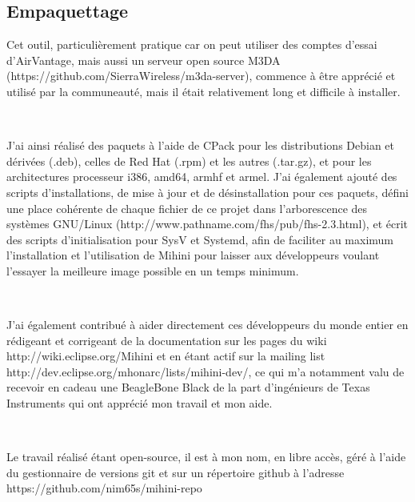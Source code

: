 \documentclass{article}
\begin{document}
\subsection{Empaquettage}
Cet outil, particulièrement pratique car on peut utiliser des comptes d’essai d’AirVantage, mais aussi un serveur open source M3DA (https://github.com/SierraWireless/m3da-server), commence à être apprécié et utilisé par la communeauté, mais il était relativement long et difficile à installer.

~

J’ai ainsi réalisé des paquets à l’aide de CPack pour les distributions Debian et dérivées (.deb), celles de Red Hat (.rpm) et les autres (.tar.gz), et pour les architectures processeur i386, amd64, armhf et armel. J’ai également ajouté des scripts d’installations, de mise à jour et de désinstallation pour ces paquets, défini une place cohérente de chaque fichier de ce projet dans l’arborescence des systèmes GNU/Linux (http://www.pathname.com/fhs/pub/fhs-2.3.html), et écrit des scripts d’initialisation pour SysV et Systemd, afin de faciliter au maximum l’installation et l’utilisation de Mihini pour laisser aux développeurs voulant l’essayer la meilleure image possible en un temps minimum.

~

J’ai également contribué à aider directement ces développeurs du monde entier en rédigeant et corrigeant de la documentation sur les pages du wiki http://wiki.eclipse.org/Mihini et en étant actif sur la mailing list http://dev.eclipse.org/mhonarc/lists/mihini-dev/, ce qui m’a notamment valu de recevoir en cadeau une BeagleBone Black de la part d’ingénieurs de Texas Instruments qui ont apprécié mon travail et mon aide.

~

Le travail réalisé étant open-source, il est à mon nom, en libre accès, géré à l’aide du gestionnaire de versions git et sur un répertoire github à l’adresse https://github.com/nim65s/mihini-repo
\end{document}
